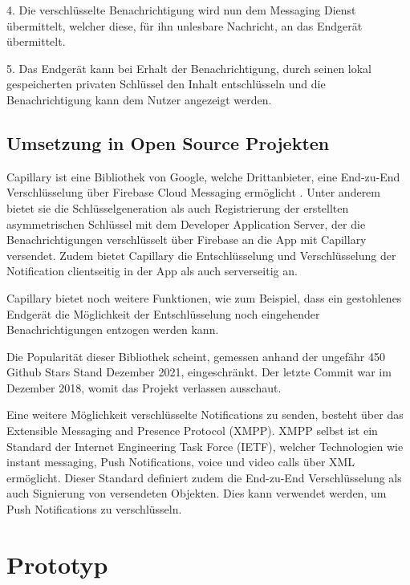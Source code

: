 \documentclass[sigconf]{acmart}
\begin{document}
4. Die verschlüsselte Benachrichtigung wird nun dem Messaging Dienst 
übermittelt, welcher diese, für ihn unlesbare Nachricht, an das Endgerät 
übermittelt.

5. Das Endgerät kann bei Erhalt der Benachrichtigung, durch seinen lokal 
gespeicherten privaten Schlüssel den Inhalt entschlüsseln und die 
Benachrichtigung kann dem Nutzer angezeigt werden.

\subsection{Umsetzung in Open Source Projekten}

Capillary ist eine Bibliothek von Google, welche Drittanbieter, eine End-zu-End 
Verschlüsselung über Firebase Cloud Messaging ermöglicht \cite{capillary}. Unter anderem 
bietet sie die Schlüsselgeneration als auch Registrierung der erstellten 
asymmetrischen Schlüssel mit dem Developer Application Server, der die 
Benachrichtigungen verschlüsselt über Firebase an die App mit Capillary 
versendet. Zudem bietet Capillary die Entschlüsselung und Verschlüsselung 
der Notification clientseitig in der App als auch serverseitig an.

Capillary bietet noch weitere Funktionen, wie zum Beispiel, dass ein gestohlenes 
Endgerät die Möglichkeit der Entschlüsselung noch eingehender Benachrichtigungen 
entzogen werden kann.

Die Popularität dieser Bibliothek scheint, gemessen anhand der ungefähr 
450 Github Stars Stand Dezember 2021, eingeschränkt. Der letzte Commit 
war im Dezember 2018, womit das Projekt verlassen ausschaut.

Eine weitere Möglichkeit verschlüsselte Notifications zu senden, 
besteht über das Extensible Messaging and Presence Protocol (XMPP).
XMPP selbst ist ein Standard der Internet Engineering Task Force (IETF), 
welcher Technologien wie instant messaging, Push Notifications, voice und 
video calls über XML ermöglicht.\cite{xmpp}\cite{xmpp3}  Dieser Standard definiert zudem die 
End-zu-End Verschlüsselung als auch Signierung von versendeten Objekten. 
Dies kann verwendet werden, um Push Notifications zu verschlüsseln.\cite{xmpp2}

\section{Prototyp}
\end{document}
